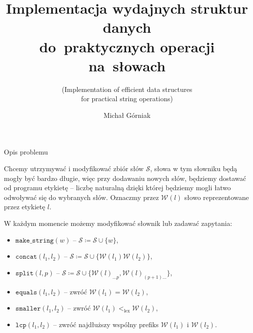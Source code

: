 \documentclass[polish]{beamer}
\title[Obrona pracy licencjackiej]{Implementacja wydajnych struktur danych\\ do~praktycznych operacji na~słowach}
\subtitle{(Implementation of efficient data structures\\ for practical string operations)}
\author{Michał Górniak}
\institute[II UWr]{Instytut Informatyki Uniwersytetu Wrocławskiego}
\date{\displaydate{date}}
\begin{document}
\begin{frame}
    \titlepage
\end{frame}


\begin{frame}{Opis problemu}
    \begin{block}{}
        Chcemy utrzymywać i modyfikować zbiór słów $\mathcal{S}$, słowa w tym słowniku będą mogły być bardzo długie, więc przy dodawaniu nowych słów, będziemy dostawać od programu etykietę -- liczbę naturalną dzięki której będziemy mogli łatwo odwoływać się do wybranych słów. Oznaczmy przez $\mathcal{W}(l)$ słowo reprezentowane przez etykietę $l$.
    \end{block}
    \pause
    W każdym momencie możemy modyfikować słownik lub zadawać zapytania:
    \begin{itemize}
        \item $\texttt{make\_string}(w)$ -- $\mathcal{S} \coloneqq \mathcal{S} \cup \{w\}$,
        \item $\texttt{concat}(l_1, l_2)$ -- $\mathcal{S} \coloneqq \mathcal{S} \cup \{\mathcal{W}(l_1)\mathcal{W}(l_2)\}$,
        \item $\texttt{split}(l, p)$ -- $\mathcal{S} \coloneqq \mathcal{S} \cup \{\mathcal{W}(l)_{\ldots p}, \mathcal{W}(l)_{(p + 1) \ldots}\}$, \pause
        \item $\texttt{equals}(l_1, l_2)$ -- zwróć $\mathcal{W}(l_1) = \mathcal{W}(l_2)$,
        \item $\texttt{smaller}(l_1, l_2)$ -- zwróć $\mathcal{W}(l_1) <_{\text{lex}} \mathcal{W}(l_2)$,
        \item $\texttt{lcp}(l_1, l_2)$ -- zwróć najdłuższy wspólny prefiks $\mathcal{W}(l_1)$ i $\mathcal{W}(l_2)$.
    \end{itemize}
\end{frame}

\newsavebox{\firstbox}
\end{document}
